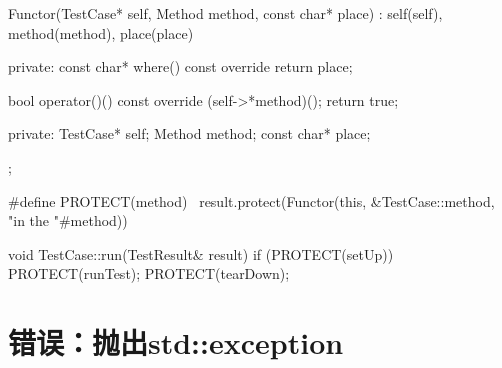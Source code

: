 \begin{content}
\begin{leftbar}
\begin{c++}[caption={\ttfamily{src/mars/core/TestResult.cc}}]
{{    Functor(TestCase* self, Method method, const char* place)
      : self(self), method(method), place(place) {
    }

  private:
    const char* where() const override {
      return place;
    }

    bool operator()() const override {
      (self->*method)();
      return true;
    }

  private:
    TestCase* self;
    Method method;
    const char* place;
  };
}

#define PROTECT(method) \
    result.protect(Functor(this, &TestCase::method, "in the "#method))

void TestCase::run(TestResult& result) {
  if (PROTECT(setUp)) {
    PROTECT(runTest);
  }
  PROTECT(tearDown);
}
 \end{c++}
\end{leftbar}

\end{content}

\section{错误：抛出std::exception}

